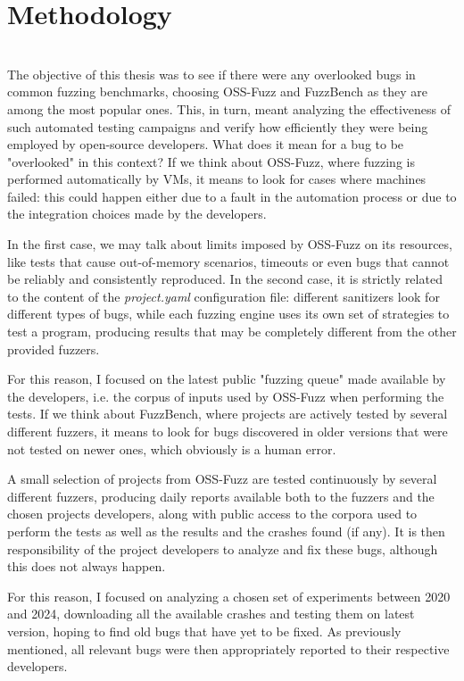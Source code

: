 
\chapter{Methodology} \label{chap_3}
\ \\
The objective of this thesis was to see if there were any overlooked bugs in common fuzzing benchmarks, choosing OSS-Fuzz and FuzzBench as they are among the most popular ones. This, in turn, meant analyzing the effectiveness of such automated testing campaigns and verify how efficiently they were being employed by open-source developers.
What does it mean for a bug to be "overlooked" in this context? 
If we think about OSS-Fuzz, where fuzzing is performed automatically by VMs, it means to look for cases where machines failed: this could happen either due to a fault in the automation process or due to the integration choices made by the developers.

In the first case, we may talk about limits imposed by OSS-Fuzz on its resources, like tests that cause out-of-memory scenarios, timeouts or even bugs that cannot be reliably and consistently reproduced. 
In the second case, it is strictly related to the content of the \textit{project.yaml} configuration file: different sanitizers look for different types of bugs, while each fuzzing engine uses its own set of strategies to test a program, producing results that may be completely different from the other provided fuzzers.

For this reason, I focused on the latest public "fuzzing queue" made available by the developers, i.e. the corpus of inputs used by OSS-Fuzz when performing the tests.
If we think about FuzzBench, where projects are actively tested by several different fuzzers, it means to look for bugs discovered in older versions that were not tested on newer ones, which obviously is a human error.

A small selection of projects from OSS-Fuzz are tested continuously by several different fuzzers, producing daily reports available both to the fuzzers and the chosen projects developers, along with public access to the corpora used to perform the tests as well as the results and the crashes found (if any). It is then responsibility of the project developers to analyze and fix these bugs, although this does not always happen.

For this reason, I focused on analyzing a chosen set of experiments between 2020 and 2024, downloading all the available crashes and testing them on latest version, hoping to find old bugs that have yet to be fixed.
As previously mentioned, all relevant bugs were then appropriately reported to their respective developers.




